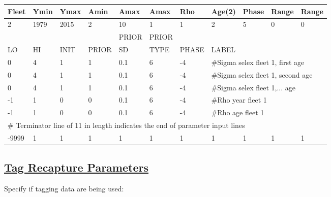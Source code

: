 \begin{longtable}{p{1cm} p{1cm} p{1cm} p{1.25cm} p{1.25cm} p{1.25cm} p{1.2cm} p{1.2cm} p{1cm} p{1cm} p{1cm}}
	Fleet & Ymin & Ymax & Amin & Amax & Amax  & Rho & Age(2)  & Phase & Range  & Range \Bstrut\\
	\hline
	2    & 1979 & 2015 &  2   &  10  & 1     & 1   & 2       & 5     & 0   & 0 \Tstrut\\
		\hline
	&    &      &       & PRIOR & PRIOR &       &     & & & \Tstrut\\
	LO & HI & INIT & PRIOR & SD    & TYPE  & PHASE & \multicolumn{4}{l}{LABEL} \Bstrut\\
	\hline
	0 & 4 & 1 & 1 & 0.1 & 6 & -4 & \multicolumn{4}{l}{\#Sigma selex fleet 1, first age} \Tstrut\\
	0 & 4 & 1 & 1 & 0.1 & 6 & -4 & \multicolumn{4}{l}{\#Sigma selex fleet 1, second age} \Tstrut\\
	0 & 4 & 1 & 1 & 0.1 & 6 & -4 & \multicolumn{4}{l}{\#Sigma selex fleet 1,... age} \Tstrut\\
	-1 & 1 & 0 & 0 & 0.1 & 6 & -4 & \multicolumn{4}{l}{\#Rho year fleet 1} \\
	-1 & 1 & 0 & 0 & 0.1 & 6 & -4 & \multicolumn{4}{l}{\#Rho age fleet 1} \\
	\hline
	\multicolumn{11}{l}{\# Terminator line of 11 in length indicates the end of parameter input lines} \\
	-9999 & 1 & 1 & 1 & 1 & 1 & 1 & 1 & 1 & 1 & 1 \\
	\hline
\end{longtable}


\hypertarget{tagrecapture}{}
\subsection[Tag Recapture Parameters]{\protect\hyperlink{tagrecapture}{Tag Recapture Parameters}}
Specify if tagging data are being used:


